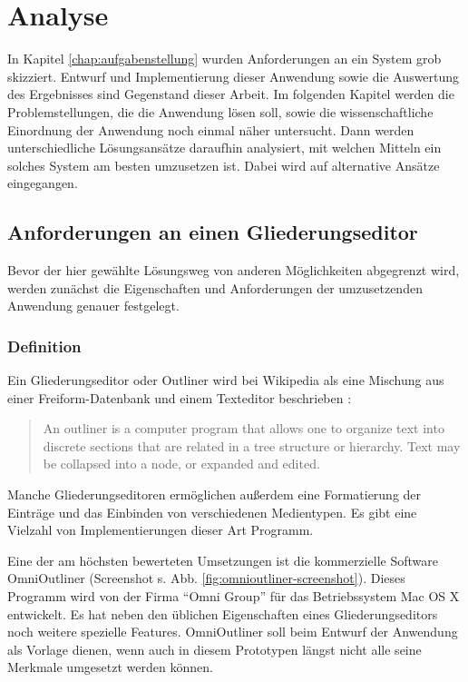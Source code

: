 \chapter{Analyse}
\label{chap:analyse}

In Kapitel \ref{chap:aufgabenstellung} wurden Anforderungen an ein System grob skizziert. Entwurf und Implementierung dieser Anwendung sowie die Auswertung des Ergebnisses sind Gegenstand dieser Arbeit. Im folgenden Kapitel werden die Problemstellungen, die die Anwendung lösen soll, sowie die wissenschaftliche Einordnung der Anwendung noch einmal näher untersucht. Dann werden unterschiedliche Lösungsansätze daraufhin analysiert, mit welchen Mitteln ein solches System am besten umzusetzen ist. Dabei wird auf alternative Ansätze eingegangen.

\section{Anforderungen an einen Gliederungseditor}

Bevor der hier gewählte Lösungsweg von anderen Möglichkeiten abgegrenzt wird, werden zunächst die Eigenschaften und Anforderungen der umzusetzenden Anwendung genauer festgelegt. 

\subsection{Definition}

Ein Gliederungseditor oder Outliner wird bei Wikipedia als eine Mischung aus einer Freiform-Datenbank und einem Texteditor beschrieben \cite{gliederungseditor}:

\begin{quote}
An outliner is a computer program that allows one to organize text into discrete sections that are related in a tree structure or hierarchy. Text may be collapsed into a node, or expanded and edited. \cite{outliner}
\end{quote}

Manche Gliederungseditoren ermöglichen außerdem eine Formatierung der Einträge und das Einbinden von verschiedenen Medientypen. Es gibt eine Vielzahl von Implementierungen dieser Art Programm. 

Eine der am höchsten bewerteten Umsetzungen \cite{omnioutliner:rating} ist die kommerzielle Software OmniOutliner \cite{omnioutliner:website} (Screenshot s. Abb. \ref{fig:omnioutliner-screenshot}). Dieses Programm wird von der Firma \enquote{Omni Group} für das Betriebssystem Mac OS X entwickelt. Es hat neben den üblichen Eigenschaften eines Gliederungseditors noch weitere spezielle Features. OmniOutliner soll beim Entwurf der Anwendung als Vorlage dienen, wenn auch in diesem Prototypen längst nicht alle seine Merkmale umgesetzt werden können.



